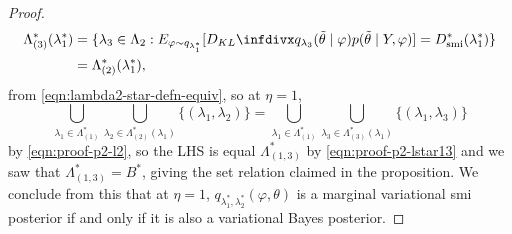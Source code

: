 \begin{proof}
\begin{align}
    \Lambda^*_{(3)}(\lambda^*_1) & = \{\lambda_3\in \Lambda_2: E_{\varphi\sim q_{\lambda^*_1}}[\kl{q_{\lambda_3}(\tilde\theta\mid \varphi)}{p(\tilde\theta \mid Y,\varphi)}]=D^*_{\smi}(\lambda^*_1)\}\nonumber \\
                                 & =\Lambda^*_{(2)}(\lambda^*_1)\label{eqn:proof-p2-l2},
  \end{align}
  from \cref{eqn:lambda2-star-defn-equiv}, so at $\eta=1$,
  \[
    \bigcup_{\lambda_1\in \Lambda^*_{(1)}}\bigcup_{\lambda_2\in \Lambda^*_{(2)}(\lambda_1)} \{(\lambda_1,\lambda_2)\}=\bigcup_{\lambda_1\in \Lambda^*_{(1)}}\bigcup_{\lambda_3\in \Lambda^*_{(3)}(\lambda_1)} \{(\lambda_1,\lambda_3)\}
  \]
  by \cref{eqn:proof-p2-l2}, so the LHS is equal $\Lambda^*_{(1,3)}$
  by \cref{eqn:proof-p2-lstar13} and we saw that $\Lambda^*_{(1,3)}=B^*$, giving the set relation claimed in the proposition.
  We conclude from this that at $\eta=1$, $q_{\lambda^*_1,\lambda^*_2}(\varphi,\theta)$ is a marginal variational \acrshort*{smi} posterior if and only if  it is also a variational Bayes posterior.
\end{proof}


